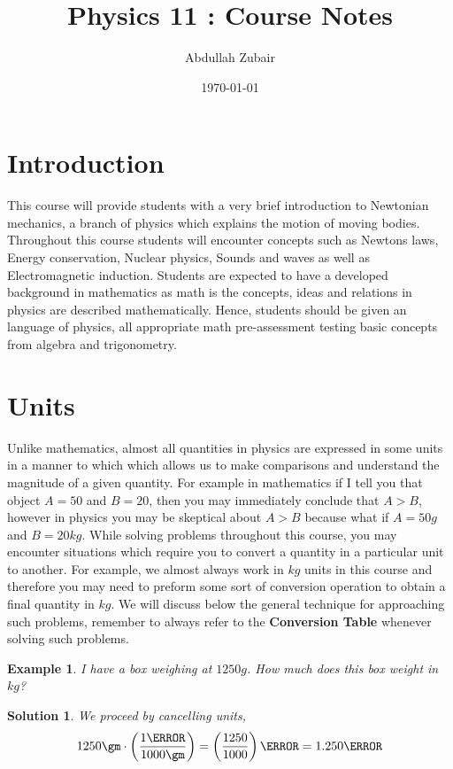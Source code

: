 \documentclass[12pt]{article}
\theoremstyle{break}
\newtheorem{ex}[thm]{Example}
\newtheorem*{soln}{Solution}
\begin{document}
\let\ref\Cref

\title{\bf{Physics 11 : Course Notes}}
\date{\today}
\author{Abdullah Zubair}

\maketitle
\newpage
\tableofcontents
\listoffigures
\listoftables
\newpage

\section{Introduction}
This course will provide students with a very brief introduction to Newtonian mechanics, a branch of physics
which explains the motion of moving bodies. Throughout this course students will encounter concepts such as
Newtons laws, Energy conservation, Nuclear physics, Sounds and waves as well as Electromagnetic induction.
Students are expected to have a developed background in mathematics as math is the concepts, ideas and relations in physics are described mathematically. Hence, students should be given an
language of physics, all
appropriate math pre-assessment testing basic concepts from algebra and trigonometry.


\newpage

\section{Units}
Unlike mathematics, almost all quantities in physics are expressed in some units in a manner to which which
allows us to make comparisons and understand the magnitude of a given quantity. For example in mathematics if
I tell you that object $A = 50$ and $B = 20$, then you may immediately conclude that $A > B$, however in
physics you may be skeptical about $A > B$ because what if $A = 50 \si{g}$ and $B = 20 \si{kg}$. While solving problems throughout this course, you may encounter situations which require you to convert a quantity in a particular unit to another. For example, we almost always work in $\si{kg}$ units in this course and therefore you may need to preform some sort of conversion operation to obtain a final quantity in $\si{kg}$. We will discuss below the general technique for approaching such problems, remember to always refer to the \textbf{Conversion Table} whenever solving such problems.

\begin{ex}
I have a box weighing at $1250\si{g}$. How much does this box weight in $\si{kg}$?
\end{ex}
\begin{soln}
We proceed by cancelling units,
$$1250\gm\cdot\left(\frac{1\kg}{1000\gm} \right) = \left(\frac{1250}{1000}\right)\kg = 1.250\kg$$
\end{soln}
\end{document}
